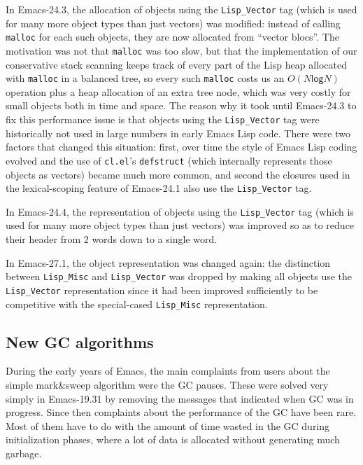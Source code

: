 \documentclass[format=acmsmall, review]{acmart}
\newcommand \Elisp {Emacs Lisp}
\begin{document}
In Emacs-24.3, the allocation of objects using the \texttt{Lisp\_Vector} tag
(which is used for many more object types than just vectors) was modified:
instead of calling \texttt{malloc} for each such objects, they are now
allocated from ``vector blocs''.  The motivation was not that
\texttt{malloc} was too slow, but that the implementation of our
conservative stack scanning keeps track of every part of the Lisp heap
allocated with \texttt{malloc} in a balanced tree, so every such
\texttt{malloc} costs us an $O(N \textsf{log} N)$ operation plus a heap
allocation of an extra tree node, which was very costly for small objects
both in time and space.  The reason why it took until Emacs-24.3 to fix this
performance issue is that objects using the \texttt{Lisp\_Vector} tag were
historically not used in large numbers in early \Elisp{} code.  There were
two factors that changed this situation: first, over time the style of
\Elisp{} coding evolved and the use of \texttt{cl.el}'s \texttt{defstruct}
(which internally represents those objects as vectors) became much more
common, and second the closures used in the lexical-scoping feature of
Emacs-24.1 also use the \texttt{Lisp\_Vector} tag.

In Emacs-24.4, the representation of objects using the \texttt{Lisp\_Vector}
tag (which is used for many more object types than just vectors) was
improved so as to reduce their header from 2 words down to a single word.

In Emacs-27.1, the object representation was changed again: the distinction
between \texttt{Lisp\_Misc} and \texttt{Lisp\_Vector} was dropped by making
all objects use the \texttt{Lisp\_Vector} representation since it had been
improved sufficiently to be competitive with the special-cased
\texttt{Lisp\_Misc} representation.


\subsection{New GC algorithms}
\label{sec:gc-algorithms}

During the early years of Emacs, the main complaints from users about the
simple mark\&sweep algorithm were the GC pauses.  These were solved very
simply in Emacs-19.31 by removing the messages that indicated when GC was in
progress.  Since then complaints about the performance of the GC have been
rare.  Most of them have to do with the amount of time wasted in the
GC during initialization phases, where a lot of data is allocated without
generating much garbage.
\end{document}
